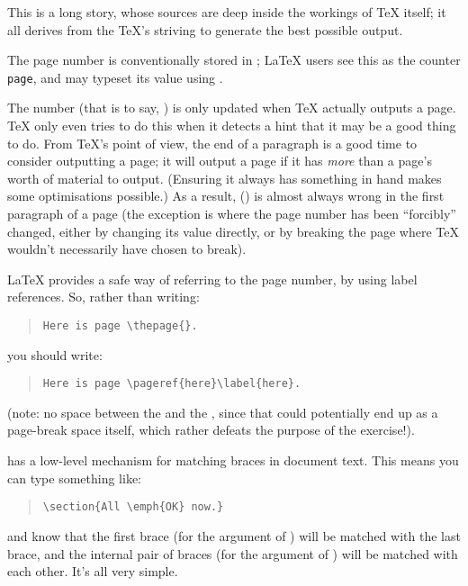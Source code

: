 
This is a long story, whose sources are deep inside the workings of
\TeX{} itself; it all derives from the \TeX{}'s striving to generate
the best possible output.

The page number is conventionally stored in ; \LaTeX{}
users see this as the counter \texttt{page}, and may typeset its value
using .

The number (that is to say, ) is only updated when \TeX{}
actually outputs a page.  \TeX{} only even tries to do this when it
detects a hint that it may be a good thing to do.  From \TeX{}'s point
of view, the end of a paragraph is a good time to consider outputting
a page; it will output a page if it has \emph{more} than a page's
worth of material to output.  (Ensuring it always has something in
hand makes some optimisations possible.)  As a result, 
() is almost always wrong in the first paragraph of a
page (the exception is where the page number has been ``forcibly''
changed, either by changing its value directly, or by breaking the
page where \TeX{} wouldn't necessarily have chosen to break).

\LaTeX{} provides a safe way of referring to the page number, by using
label references.  So, rather than writing:
\begin{quote}
\begin{verbatim}
Here is page \thepage{}.
\end{verbatim}
\end{quote}
you should write:
\begin{quote}
\begin{verbatim}
Here is page \pageref{here}\label{here}.
\end{verbatim}
\end{quote}
(note: no space between the  and the , since
that could potentially end up as a page-break space itself, which
rather defeats the purpose of the exercise!).


\AllTeX{} has a low-level mechanism for matching braces in document
text.  This means you can type something like:
\begin{quote}
\begin{verbatim}
\section{All \emph{OK} now.}
\end{verbatim}
\end{quote}
and know that the first brace (for the argument of ) will
be matched with the last brace, and the internal pair of braces (for
the argument of ) will be matched with each other.  It's all
very simple.

